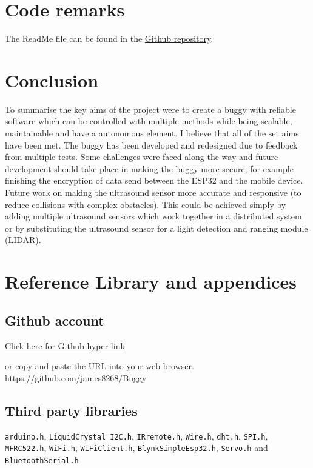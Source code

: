 \documentclass[8pt, a4paper]{article}
\begin{document}
	

\section{Code remarks}

The ReadMe file can be found in the \href{https://github.com/james8268/Buggy}{Github repository}. 


\section{Conclusion}
To summarise the key aims of the project were to create a buggy with reliable software which can be controlled with multiple methods while being scalable, maintainable and have a autonomous element. I believe that all of the set aims have been met. The buggy has been developed and redesigned due to feedback from multiple tests. Some challenges were faced along the way and future development should take place in making the buggy more secure, for example finishing the encryption of data send between the ESP32 and the mobile device. Future work on making the ultrasound sensor more accurate and responsive (to reduce collisions with complex obstacles). This could be achieved simply by adding multiple ultrasound sensors which work together in a distributed system or by substituting the ultrasound sensor for a light detection and ranging module (LIDAR). 


\newpage
\section{Reference Library and appendices}
\subsection{Github account}

\href{https://github.com/james8268/Buggy}{Click here for Github hyper link} 

or copy and paste the URL into your web browser. https://github.com/james8268/Buggy

\listoffigures

\subsection{Third party libraries}

\verb|arduino.h|, \verb|LiquidCrystal_I2C.h|, \verb|IRremote.h|, \verb|Wire.h|, \verb|dht.h|, \verb|SPI.h|, \verb|MFRC522.h|, \verb|WiFi.h|, \verb|WiFiClient.h|, \verb|BlynkSimpleEsp32.h|, \verb|Servo.h| and \verb|BluetoothSerial.h|
\end{document}
